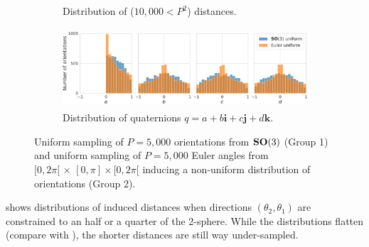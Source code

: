 \begin{figure}[ht!]
\begin{subfigure}[b]{0.36\linewidth}
        \caption{Distribution of ($10,000<P^2$) distances.}%
        \label{fig:orientation-sampling:distances}
    \end{subfigure}
    \hfill
    \begin{subfigure}[b]{0.58\linewidth}
        \centering
        \includegraphics[height=8em]{figures/uniform_quaternions_vs_angles_q.pdf}
        \caption{Distribution of quaternions $q = a + b\boldsymbol{i} + c\boldsymbol{j} + d\boldsymbol{k}$.}
    \end{subfigure}
    \caption{%
        Uniform sampling of $P=5,000$ orientations from $\mathrm{\mathbf{SO}}(3)$ (Group 1) and uniform sampling of $P=5,000$ Euler angles from $[0,2\pi[ \, \times \, [0,\pi] \times [0,2\pi[$ inducing a non-uniform distribution of orientations (Group 2).
    }\label{fig:orientation-sampling}
\end{figure}

 shows distributions of induced distances when directions $(\theta_2, \theta_1)$ are constrained to an half or a quarter of the 2-sphere.
While the distributions flatten (compare with ), the shorter distances are still way under-sampled.

